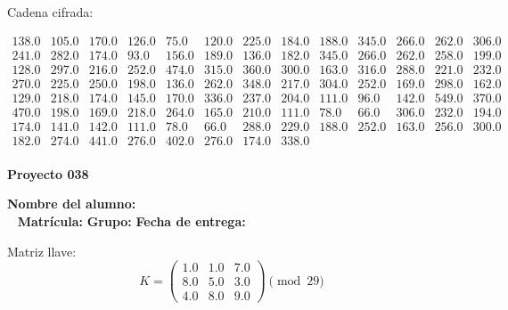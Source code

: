 \documentclass[12pt]{article}
\begin{document}
Cadena cifrada:
\begin{center}
$\begin{array}{lllllllllllll}
138.0 & 105.0 & 170.0 & 126.0 & 75.0 & 120.0 & 225.0 & 184.0 & 188.0 & 345.0 & 266.0 & 262.0 & 306.0\\
241.0 & 282.0 & 174.0 & 93.0 & 156.0 & 189.0 & 136.0 & 182.0 & 345.0 & 266.0 & 262.0 & 258.0 & 199.0\\
128.0 & 297.0 & 216.0 & 252.0 & 474.0 & 315.0 & 360.0 & 300.0 & 163.0 & 316.0 & 288.0 & 221.0 & 232.0\\
270.0 & 225.0 & 250.0 & 198.0 & 136.0 & 262.0 & 348.0 & 217.0 & 304.0 & 252.0 & 169.0 & 298.0 & 162.0\\
129.0 & 218.0 & 174.0 & 145.0 & 170.0 & 336.0 & 237.0 & 204.0 & 111.0 & 96.0 & 142.0 & 549.0 & 370.0\\
470.0 & 198.0 & 169.0 & 218.0 & 264.0 & 165.0 & 210.0 & 111.0 & 78.0 & 66.0 & 306.0 & 232.0 & 194.0\\
174.0 & 141.0 & 142.0 & 111.0 & 78.0 & 66.0 & 288.0 & 229.0 & 188.0 & 252.0 & 163.0 & 256.0 & 300.0\\
182.0 & 274.0 & 441.0 & 276.0 & 402.0 & 276.0 & 174.0 & 338.0\\
\end{array}$
\end{center}

\newpage


\textbf{Proyecto 038}

\textbf{Nombre del alumno:} \underline{\hspace{13cm}}\\\
\vspace{1cm}
\textbf{Matrícula:} \underline{\hspace{4cm}} \hspace{1cm}
\textbf{Grupo:} \underline{\hspace{2cm}}
\textbf{Fecha de entrega:} \underline{\hspace{2cm}}

\medskip

Matriz llave:
\[
K = \begin{pmatrix}
1.0 & 1.0 & 7.0\\
8.0 & 5.0 & 3.0\\
4.0 & 8.0 & 9.0
\end{pmatrix} \pmod{29}
\]
\end{document}
